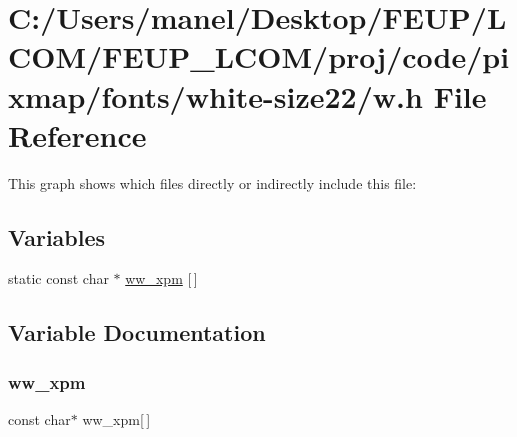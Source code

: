 \hypertarget{white-size22_2w_8h}{}\section{C\+:/\+Users/manel/\+Desktop/\+F\+E\+U\+P/\+L\+C\+O\+M/\+F\+E\+U\+P\+\_\+\+L\+C\+O\+M/proj/code/pixmap/fonts/white-\/size22/w.h File Reference}
\label{white-size22_2w_8h}
This graph shows which files directly or indirectly include this file\+:
\subsection*{Variables}
\begin{DoxyCompactItemize}
\item 
static const char $\ast$ \mbox{\hyperlink{white-size22_2w_8h_a0a852bf34195c54d4a6f8f51b1455783}{ww\+\_\+xpm}} \mbox{[}$\,$\mbox{]}
\end{DoxyCompactItemize}


\subsection{Variable Documentation}
\mbox{\label{white-size22_2w_8h_a0a852bf34195c54d4a6f8f51b1455783}} 
\subsubsection{\texorpdfstring{ww\_xpm}{ww\_xpm}}
{\footnotesize\ttfamily const char$\ast$ ww\+\_\+xpm\mbox{[}$\,$\mbox{]}\hspace{0.3cm}{\ttfamily [static]}}

